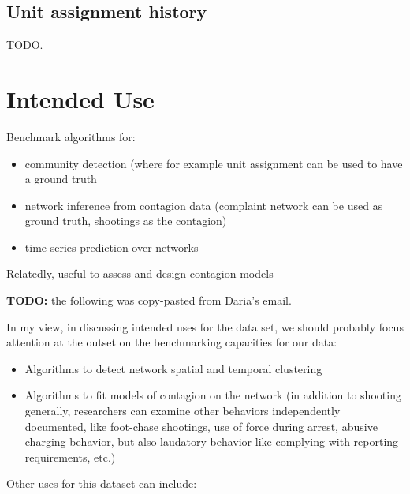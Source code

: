 \documentclass{article}
\begin{document}
\subsection{Unit assignment history} TODO.




\section{Intended Use}

Benchmark algorithms for:
\begin{itemize}
	\item community detection (where for example unit assignment can be used to
		have a ground truth
	\item network inference from contagion data (complaint network can be used
		as ground truth, shootings as the contagion)
	\item time series prediction over networks
\end{itemize}

Relatedly, useful to assess and design contagion models


\textbf{TODO:} the following was copy-pasted from Daria's email.

In my view, in discussing intended uses for the data set, we should probably focus attention at the outset on the benchmarking capacities for our data:

\begin{itemize}
	\item Algorithms to detect network spatial and temporal clustering
	\item Algorithms to fit models of contagion on the network (in addition to shooting generally, researchers can examine other behaviors independently documented, like foot-chase shootings, use of force during arrest, abusive charging behavior, but also laudatory behavior like complying with reporting requirements, etc.)
\end{itemize}

Other uses for this dataset can include:
\end{document}
